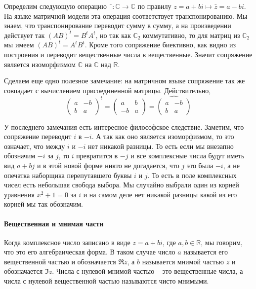 Определим следующую операцию $\bar{\phantom{z}}\colon \mathbb C\to \mathbb C$ по правилу $z = a + bi \mapsto \bar z = a - bi$.
На языке матричной модели эта операция соответствует транспонированию.
Мы знаем, что транспонирование переводит сумму в сумму, а на произведении действует так $(AB)^t = B^t A^t$, но так как $\mathbb C_2$ коммутативно, то для матриц из $\mathbb C_2$ мы имеем $(AB)^t = A^t B^t$.
Кроме того сопряжение биективно, как видно из построения и переводит вещественные числа в вещественные.
Значит сопряжение является изоморфизмом $\mathbb C$ на $\mathbb C$ над $\mathbb R$.

Сделаем еще одно полезное замечание: на матричном языке сопряжение так же совпадает с вычислением присоединенной матрицы.
Действительно,
\[
\begin{pmatrix}
{a}&{-b}\\
{b}&{a}
\end{pmatrix}^t
= 
\begin{pmatrix}
{a}&{b}\\
{-b}&{a}
\end{pmatrix}
=
\widehat{
\begin{pmatrix}
{a}&{-b}\\
{b}&{a}
\end{pmatrix}}
\]

У последнего замечания есть интересное философское следствие.
Заметим, что сопряжение переводит $i$ в $-i$.
А так как оно является изоморфизмом, то это означает, что между $i$ и $-i$ нет никакой разницы.
То есть если мы внезапно обозначим $-i$ за $j$, то $i$ превратится в $-j$ и все комплексные числа будут иметь вид $a + bj$ и в этой новой форме никто не догадается, что $j$ это была $-i$, а не опечатка наборщика перепутавшего буквы $i$ и $j$.
То есть в поле комплексных чисел есть небольшая свобода выбора.
Мы случайно выбрали один из корней уравнения $x^2 + 1 = 0$ за $i$ и на самом деле нет никакой разницы какой из его корней мы так обозначим.

\paragraph{Вещественная и мнимая части}

Когда комплексное число записано в виде $z = a + bi$, где $a,b\in\mathbb R$, мы говорим, что это его алгебраическая форма.
В таком случае число $a$ называется его вещественной частью и обозначается $\Re z$, а $b$ называется мнимой частью $z$ и обозначается $\Im z$.
Числа с нулевой мнимой частью -- это вещественные числа, а числа с нулевой вещественной частью называются чисто мнимыми.

